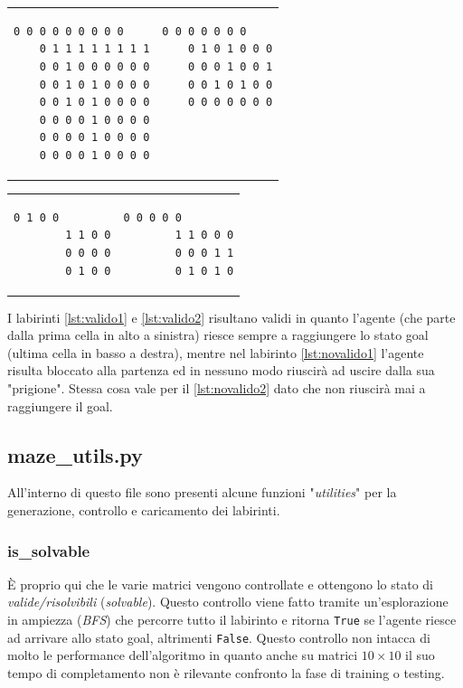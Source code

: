 \begin{tabular}{m{20em}  m{20em}}
\begin{lstlisting}[style=python, caption={Labirinto 8x9 valido}, label={lst:valido1}]
	0 0 0 0 0 0 0 0 0
	0 1 1 1 1 1 1 1 1
	0 0 1 0 0 0 0 0 0
	0 0 1 0 1 0 0 0 0
	0 0 1 0 1 0 0 0 0
	0 0 0 0 1 0 0 0 0
	0 0 0 0 1 0 0 0 0
	0 0 0 0 1 0 0 0 0
\end{lstlisting}
&
\begin{lstlisting}[style=python, caption={Labirinto 5x7 valido}, label={lst:valido2}]
	0 0 0 0 0 0 0
	0 1 0 1 0 0 0
	0 0 0 1 0 0 1
	0 0 1 0 1 0 0
	0 0 0 0 0 0 0
	
	
	
\end{lstlisting}
\end{tabular}

\begin{tabular}{m{20em}  m{20em}}
	\begin{lstlisting}[style=python, caption={Labirinto 4x4 NON valido}, label={lst:novalido1}]
		0 1 0 0
		1 1 0 0
		0 0 0 0
		0 1 0 0
	\end{lstlisting}
	&
	\begin{lstlisting}[style=python, caption={Labirinto 4x5 NON valido}, label={lst:novalido2}]
		0 0 0 0 0
		1 1 0 0 0
		0 0 0 1 1
		0 1 0 1 0
	\end{lstlisting}
\end{tabular}

I labirinti \ref{lst:valido1} e \ref{lst:valido2} risultano validi in quanto l'agente (che parte dalla prima cella in alto a sinistra) riesce sempre a raggiungere lo stato goal (ultima cella in basso a destra), mentre nel labirinto \ref{lst:novalido1} l'agente risulta bloccato alla partenza ed in nessuno modo riuscir\`{a} ad uscire dalla sua "prigione". Stessa cosa vale per il \ref{lst:novalido2} dato che non riuscir\`{a} mai a raggiungere il goal.

\subsection{maze\_utils.py}
All'interno di questo file sono presenti alcune funzioni "\textit{utilities}" per la generazione, controllo e caricamento dei labirinti. 

\subsubsection{is\_solvable}
\`{E} proprio qui che le varie matrici vengono controllate e ottengono lo stato di \textit{valide/risolvibili} (\textit{solvable}).  %
Questo controllo viene fatto tramite un'esplorazione in ampiezza (\textit{BFS}) che percorre tutto il labirinto e ritorna \lstinline[style=cmd]|True| se l'agente riesce ad arrivare allo stato goal, altrimenti \lstinline[style=cmd]|False|. Questo controllo non intacca di molto le performance dell'algoritmo in quanto anche su matrici $10 \times 10$ il suo tempo di completamento non \`{e} rilevante confronto la fase di training o testing. %

